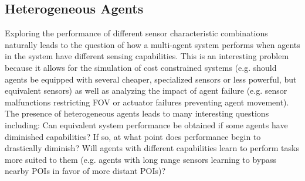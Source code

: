 \documentclass[letterpaper, 10 pt, conference]{ieeeconf}  %
\begin{document}
\subsection{Heterogeneous Agents}
Exploring the performance of different sensor characteristic combinations naturally leads to the question of how a multi-agent system performs when agents in the system have different sensing capabilities. This is an interesting problem because it allows for the simulation of cost constrained systems (e.g. should agents be equipped with several cheaper, specialized sensors or less powerful, but equivalent sensors) as well as analyzing the impact of agent failure (e.g. sensor malfunctions restricting FOV or actuator failures preventing agent movement). The presence of heterogeneous agents leads to many interesting questions including: Can equivalent system performance be obtained if some agents have diminished capabilities? If so, at what point does performance begin to drastically diminish? Will agents with different capabilities learn to perform tasks more suited to them (e.g. agents with long range sensors learning to bypass nearby POIs in favor of more distant POIs)?



\end{document}
